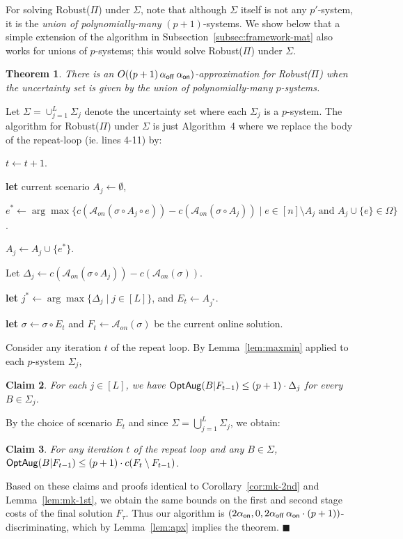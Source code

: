 \documentclass[11pt,letterpaper]{article}
\newtheorem{theorem}{Theorem}[section]
\newtheorem{claim}[theorem]{Claim}
\newenvironment{proof}{

\noindent{\bf Proof:}} {\hfill$\blacksquare$


}
\def\a{\ensuremath{\mathcal{A}}\xspace}
\def\cov{\ensuremath{\Pi}\xspace}
\def\rcov{{\sf Robust(\cov)}\xspace}
\newcommand{\offline}{\alpha_{\sf off}}
\newcommand{\online}{\alpha_{\sf on}}
\newcommand{\optaug}{{\sf OptAug}}
\newcounter{note}[section]
\begin{document}
For solving \rcov under $\Sigma$, note that although $\Sigma$ itself is not any $p'$-system, it is the {\em union  of
polynomially-many} $(p+1)$-systems. We show below that a simple extension of the algorithm in
Subsection~\ref{subsec:framework-mat} also works for unions of $p$-systems; this would solve \rcov under $\Sigma$.
\begin{theorem}\label{th:p-sets-union}
There is an $O((p+1)\, \offline\, \online)$-approximation for \rcov when the uncertainty set is given by the  union of
polynomially-many $p$-systems.
\end{theorem}
\begin{proof}
Let $\Sigma=\cup_{j=1}^L \Sigma_j$ denote the uncertainty set where each $\Sigma_j$ is a $p$-system. The algorithm for
\rcov under $\Sigma$ is just Algorithm~4 where we replace the body of the repeat-loop (ie. lines 4-11) by:
  \begin{algorithmic}[1]
   $t\leftarrow t+1$.


  \STATE \textbf{let} current scenario $A_j \gets \emptyset$,


    \STATE $e^* \leftarrow \arg\max\{ c(\a_{on}(\sigma \circ A_j\circ e)) -
    c(\a_{on}(\sigma\circ A_j)) \mid e\in [n]\setminus A_j \text{ and } A_j \cup
    \{e\}\in \Omega\}$.

    \STATE  $A_{j} \gets A_j \cup \{e^* \}$.

    \ENDWHILE
 \STATE Let $\Delta_j  \gets c(\a_{on}(\sigma\circ A_j)) - c(\a_{on}(\sigma))$.

 \ENDFOR

    \STATE \textbf{let} $j^* \gets \arg\max\{\Delta_j \mid j\in [L]\}$, and $E_t\gets A_{j^*}$.

    \STATE \textbf{let} $\sigma\gets \sigma\circ E_t$ and  $F_t \gets
    \a_{on}(\sigma)$ be the current online solution.
\end{algorithmic}

Consider any iteration $t$ of the repeat loop. By Lemma~\ref{lem:maxmin} applied to each $p$-system $\Sigma_j$,
\begin{claim}
For each $j\in [L]$, we have $\optaug(B|F_{t-1}) \le (p+1)\cdot \Delta_j$ for every $B\in \Sigma_j$.
\end{claim}
By the choice of scenario $E_t$ and since $\Sigma=\bigcup_{j=1}^L \Sigma_j$, we obtain:
\begin{claim}
For any iteration $t$ of the repeat loop and any $B\in \Sigma$, $\optaug(B|F_{t-1}) \le (p+1)\cdot c(F_t\setminus
F_{t-1})$.
\end{claim}
Based on these claims and proofs identical to Corollary~\ref{cor:mk-2nd} and Lemma~\ref{lem:mk-1st}, we obtain the same
bounds on the first and second stage costs of the final solution $F_\tau$. Thus our algorithm is $\left(2\online, 0,
2\offline\,\online\cdot (p+1) \right)$-discriminating, which by Lemma~\ref{lem:apx} implies the theorem.
\end{proof}
\end{document}
